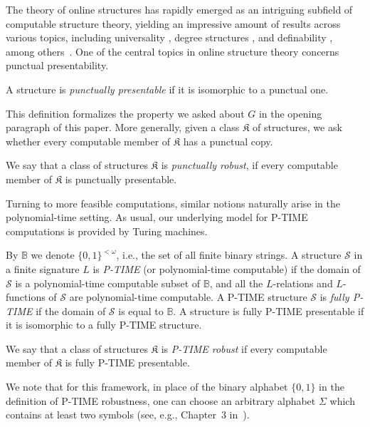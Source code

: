 \documentclass[a4paper,UKenglish,cleveref, autoref, thm-restate]{lipics-v2021}
\begin{document}
The theory of online structures has rapidly emerged as an intriguing subfield of computable structure theory, yielding an impressive amount of results across various topics, including universality \cite{downey2020punctual,DowneyHKMT-20}, degree structures \cite{bazhenov2020online,greenberg2021non,MelNg-IJM}, and definability \cite{kalimullin_definability}, among others~\cite{PRA-24,Mel-Dorzhieva-23,MelNg-PAMS}. 
One of the central topics in online structure theory concerns punctual presentability.
\begin{definition}
A structure is \emph{punctually presentable} if it is isomorphic to a punctual one.
\end{definition}
This definition formalizes the property we asked about $G$ in the opening paragraph of this paper. More generally, given a class $\mathfrak K$ of structures, we ask whether every computable member of $\mathfrak K$ has a punctual copy.  \begin{definition}
    We say that a class of structures $\mathfrak{K}$ is \emph{punctually robust}, if every computable member of $\mathfrak{K}$ is punctually presentable.
\end{definition}


Turning to more feasible computations, similar notions naturally arise in the polynomial-time setting. 
As usual, our underlying model for P-TIME computations is provided by Turing machines.

\begin{definition}
     By $\mathbb{B}$ we denote $\{0,1\}^{<\omega}$, i.e., the set of all finite binary strings. A structure $\mathcal{S}$ in a finite signature $L$ is \emph{P-TIME} (or polynomial-time computable) if the domain of $\mathcal{S}$ is a polynomial-time computable subset of $\mathbb{B}$, and all the $L$-relations and $L$-functions of $\mathcal{S}$ are polynomial-time computable. 
     A P-TIME structure $\mathcal{S}$ is \emph{fully P-TIME} if the domain of $\mathcal{S}$ is equal to $\mathbb{B}$. A structure is fully P-TIME presentable if it is isomorphic to a fully P-TIME structure.

     We say that a class of structures $\mathfrak{K}$ is \emph{P-TIME robust} if every computable member of $\mathfrak{K}$ is fully P-TIME presentable. 
\end{definition}

We note that for this framework, in place of the binary alphabet $\{0,1\}$ in the definition of P-TIME robustness, one can choose an arbitrary alphabet $\Sigma$ which contains at least two symbols (see, e.g., Chapter~3 in~\cite{Cenzer-Remmel-Survey-PTIME}). 
\end{document}
